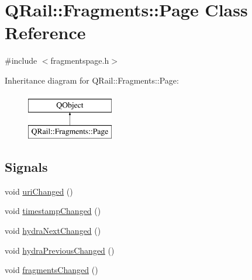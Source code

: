 \hypertarget{classQRail_1_1Fragments_1_1Page}{}\section{Q\+Rail\+::Fragments\+::Page Class Reference}
\label{classQRail_1_1Fragments_1_1Page}


{\ttfamily \#include $<$fragmentspage.\+h$>$}

Inheritance diagram for Q\+Rail\+::Fragments\+::Page\+:\begin{figure}[H]
\begin{center}
\leavevmode
\includegraphics[height=2.000000cm]{classQRail_1_1Fragments_1_1Page}
\end{center}
\end{figure}
\subsection*{Signals}
\begin{DoxyCompactItemize}
\item 
void \mbox{\hyperlink{classQRail_1_1Fragments_1_1Page_a87f9b4f40af2e858ea3e046a2107631e}{uri\+Changed}} ()
\item 
void \mbox{\hyperlink{classQRail_1_1Fragments_1_1Page_ad20cb20db04844c84f6c5b5217b6742c}{timestamp\+Changed}} ()
\item 
void \mbox{\hyperlink{classQRail_1_1Fragments_1_1Page_a37660e9c74322edef13d9c27633ad749}{hydra\+Next\+Changed}} ()
\item 
void \mbox{\hyperlink{classQRail_1_1Fragments_1_1Page_a46ef4cd59dea07b094e432445a103597}{hydra\+Previous\+Changed}} ()
\item 
void \mbox{\hyperlink{classQRail_1_1Fragments_1_1Page_a7403651ceb8ea2d7fb8c13ae9b46dc44}{fragments\+Changed}} ()
\end{DoxyCompactItemize}
